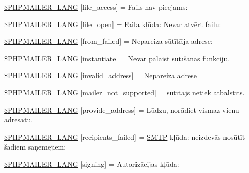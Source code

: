 \begin{DoxyCompactItemize}
\item 
\hyperlink{phpmailer_8lang-lv_8php_a7e83349023b856ef9e5c46e30ae6d51e}{\$\+P\+H\+P\+M\+A\+I\+L\+E\+R\+\_\+\+L\+A\+NG} \mbox{[}\textquotesingle{}file\+\_\+access\textquotesingle{}\mbox{]} = \textquotesingle{}Fails nav pieejams\+: \textquotesingle{}
\item 
\hyperlink{phpmailer_8lang-lv_8php_a28d1a6517bf4c942a0ddd506188ad2e0}{\$\+P\+H\+P\+M\+A\+I\+L\+E\+R\+\_\+\+L\+A\+NG} \mbox{[}\textquotesingle{}file\+\_\+open\textquotesingle{}\mbox{]} = \textquotesingle{}Faila kļūda\+: Nevar atvērt failu\+: \textquotesingle{}
\item 
\hyperlink{phpmailer_8lang-lv_8php_adf832ae12155a09be077c6d5e4fd7e22}{\$\+P\+H\+P\+M\+A\+I\+L\+E\+R\+\_\+\+L\+A\+NG} \mbox{[}\textquotesingle{}from\+\_\+failed\textquotesingle{}\mbox{]} = \textquotesingle{}Nepareiza sūtītāja adrese\+: \textquotesingle{}
\item 
\hyperlink{phpmailer_8lang-lv_8php_ad58dde16780f4770ccf4dd282ea1f5ad}{\$\+P\+H\+P\+M\+A\+I\+L\+E\+R\+\_\+\+L\+A\+NG} \mbox{[}\textquotesingle{}instantiate\textquotesingle{}\mbox{]} = \textquotesingle{}Nevar palaist sūtīšanas funkciju.\textquotesingle{}
\item 
\hyperlink{phpmailer_8lang-lv_8php_a42d61bcea4c79599ecb44fd062f54d47}{\$\+P\+H\+P\+M\+A\+I\+L\+E\+R\+\_\+\+L\+A\+NG} \mbox{[}\textquotesingle{}invalid\+\_\+address\textquotesingle{}\mbox{]} = \textquotesingle{}Nepareiza adrese\textquotesingle{}
\item 
\hyperlink{phpmailer_8lang-lv_8php_aa2ebcb8833ee83a7ad67401c4bb3a6ad}{\$\+P\+H\+P\+M\+A\+I\+L\+E\+R\+\_\+\+L\+A\+NG} \mbox{[}\textquotesingle{}mailer\+\_\+not\+\_\+supported\textquotesingle{}\mbox{]} = \textquotesingle{} sūtītājs netiek atbalstīts.\textquotesingle{}
\item 
\hyperlink{phpmailer_8lang-lv_8php_a8b97897c2406b7392b056f375feeefbb}{\$\+P\+H\+P\+M\+A\+I\+L\+E\+R\+\_\+\+L\+A\+NG} \mbox{[}\textquotesingle{}provide\+\_\+address\textquotesingle{}\mbox{]} = \textquotesingle{}Lūdzu, norādiet vismaz vienu adresātu.\textquotesingle{}
\item 
\hyperlink{phpmailer_8lang-lv_8php_a7589d30bb9b368327c2df015f3e6bcba}{\$\+P\+H\+P\+M\+A\+I\+L\+E\+R\+\_\+\+L\+A\+NG} \mbox{[}\textquotesingle{}recipients\+\_\+failed\textquotesingle{}\mbox{]} = \textquotesingle{}\hyperlink{class_s_m_t_p}{S\+M\+TP} kļūda\+: neizdevās nosūtīt šādiem saņēmējiem\+: \textquotesingle{}
\item 
\hyperlink{phpmailer_8lang-lv_8php_a68e437bdb9b968a5a67320f03d231565}{\$\+P\+H\+P\+M\+A\+I\+L\+E\+R\+\_\+\+L\+A\+NG} \mbox{[}\textquotesingle{}signing\textquotesingle{}\mbox{]} = \textquotesingle{}Autorizācijas kļūda\+: \textquotesingle{}

\end{DoxyCompactItemize}
